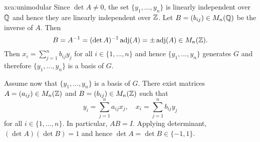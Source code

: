 \begin{sol}{xca:unimodular}
    Since $\det A\ne 0$, the set $\{y_1,\dots,y_n\}$ is linearly independent over $\mathbb{Q}$
    and hence they are linearly independent over $\mathbb{Z}$. 
    Let $B=(b_{ij})\in M_n(\mathbb{Q})$ be the inverse of $A$. Then 
    \[
    B=A^{-1}=(\det A)^{-1}\operatorname{adj}(A)=\pm\operatorname{adj}(A)\in M_n(\mathbb{Z}).
    \]
    Then $x_i=\sum_{j=1}^n b_{ij}y_j$ for all $i\in\{1,\dots,n\}$ 
    and hence $\{y_1,\dots,y_n\}$ generates $G$ and therefore 
    $\{y_1,\dots,y_n\}$ is a basis of $G$. 
    
    Assume now that $\{y_1,\dots,y_n\}$ is a basis of $G$. There exist matrices 
    $A=(a_{ij})\in M_n(\mathbb{Z})$ and $B=(b_{ij})\in M_n(\mathbb{Z})$ such that
    \[
    y_i=\sum_{j=1}^{n}a_{ij}x_j,\quad
    x_i=\sum_{j=1}^{n}b_{ij}y_j
    \]
    for all $i\in\{1,\dots,n\}$. In particular, 
    $AB=I$. Applying determinant, $(\det A)(\det B)=1$ and hence $\det A=\det B\in\{-1,1\}$. 
\end{sol}

    
